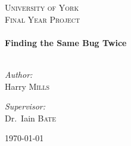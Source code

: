 \begin{titlepage}
\begin{center}

\textsc{\LARGE University of York}\\[1.5cm]
\textsc{\Large Final Year Project}\\[0.5cm]

\HRule \\[0.4cm]
{ \huge \bfseries Finding the Same Bug Twice}\\[0.4cm]
\HRule \\[1.5cm]

\begin{minipage}{0.4\textwidth}
\begin{flushleft} \large
\emph{Author:}\\
Harry \textsc{Mills}
\end{flushleft}
\end{minipage}

\begin{minipage}{0.4\textwidth}
\begin{flushright} \large
\emph{Supervisor:}\\
Dr.~Iain \textsc{Bate}
\end{flushright}
\end{minipage}

\vfill

{\large \today}

\end{center}
\end{titlepage}
